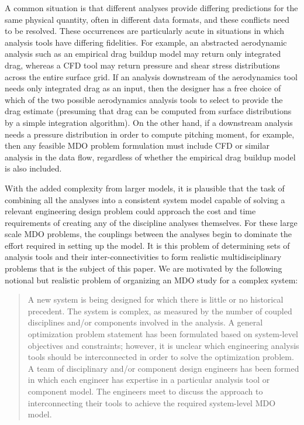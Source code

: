     A common situation is that different analyses provide differing predictions for the 
    same physical quantity, often in different data formats, and these conflicts need to be resolved. 
    These occurrences are particularly acute in situations in which analysis tools have differing fidelities. For
    example, an abstracted aerodynamic analysis such as an empirical drag buildup model may return only
    integrated drag, whereas a CFD tool may return pressure and shear stress distributions across the entire
    surface grid. If an analysis downstream of the aerodynamics tool needs only integrated drag as an input,
    then the designer has a free choice of which of the two possible aerodynamics analysis tools to select to
    provide the drag estimate (presuming that drag can be computed from surface distributions by a simple
    integration algorithm). On the other hand, if a downstream analysis needs a pressure distribution in
    order to compute pitching moment, for example, then any feasible MDO problem formulation must
    include CFD or similar analysis in the data flow, regardless of whether the empirical drag buildup model
    is also included.

    With the added complexity from larger models, it is plausible that the task of combining all the analyses into a 
    consistent system model capable of solving a relevant engineering design 
    problem could approach the cost and time requirements of creating any of the discipline 
    analyses themselves. For these large scale MDO problems, the couplings between the 
    analyses begin to dominate the effort required in setting up the model. It is this problem of 
    determining sets of analysis tools and their inter-connectivities to form realistic
    multidisciplinary problems that is the subject of this paper. We are motivated by the following notional
    but realistic problem of organizing an MDO study for a complex system:

    \begin{quote}
    A new system is being designed for which there is little or no historical precedent. The system
    is complex, as measured by the number of coupled disciplines and/or components involved in the
    analysis. A general optimization problem statement has been formulated based on system-level objectives and constraints; however, it is unclear which engineering analysis tools should
    be interconnected in order to solve the optimization problem. A team of disciplinary and/or component design engineers has been formed in which each engineer has expertise in a
    particular analysis tool or component model. The engineers meet to discuss the approach to
    interconnecting their tools to achieve the required system-level MDO model.
    \end{quote}

